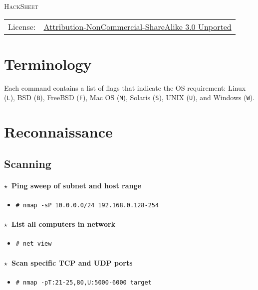 \documentclass[10pt,landscape]{article}
\newcommand{\os}[1]{\texttt{\footnotesize{#1}}}
\newcommand{\unix}{\os{U}}
\newcommand{\freebsd}{\os{F}}
\newcommand{\bsd}{\os{B}}
\newcommand{\linux}{\os{L}}
\newcommand{\solaris}{\os{S}}
\newcommand{\macos}{\os{M}}
\newcommand{\windows}{\os{W}}
\newenvironment{action}[1]
  {\paragraph{$\star$~#1}\begin{itemize}[leftmargin=1cm]}
  {\end{itemize}}
\newcommand{\cmd}[2]{\item[#1] {\small\tt\# #2}}
\begin{document}
\begin{multicols*}{3}

{\Huge\scshape
HackSheet\hspace{-2pt}\hspace{-4pt}
}


{\scriptsize
{}
\begin{tabular}{l l}
License: & \href{http://creativecommons.org/licenses/by-nc-sa/3.0/}
                {Attribution-NonCommercial-ShareAlike 3.0 Unported}
\end{tabular}
}


\vspace{-10pt}

\section*{Terminology}

Each command contains a list of flags that indicate the OS requirement: Linux
(\linux), BSD (\bsd), FreeBSD (\freebsd), Mac OS (\macos), Solaris (\solaris),
UNIX (\unix), and Windows (\windows).

\section*{Reconnaissance}

\subsection*{Scanning}

\begin{action}{Ping sweep of subnet and host range}
\cmd{\unix}{nmap -sP 10.0.0.0/24 192.168.0.128-254}
\end{action}

\begin{action}{List all computers in network}
\cmd{\windows}{net view}
\end{action}

\begin{action}{Scan specific TCP and UDP ports}
\cmd{\unix}{nmap -pT:21-25,80,U:5000-6000 target}
\end{action}


\end{multicols*}
\end{document}
